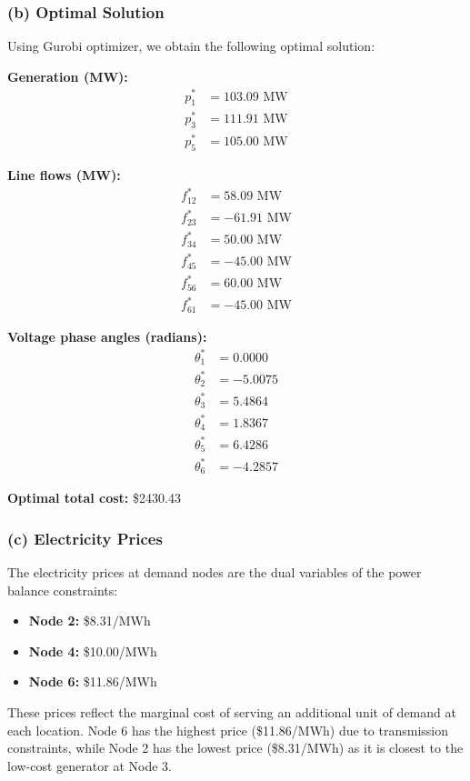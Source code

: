 \documentclass[11pt]{article}
\begin{document}
\begin{enumerate}
\subsubsection*{(b) Optimal Solution}

Using Gurobi optimizer, we obtain the following optimal solution:

\textbf{Generation (MW):}
\begin{align}
p_1^* &= 103.09 \text{ MW} \\
p_3^* &= 111.91 \text{ MW} \\
p_5^* &= 105.00 \text{ MW}
\end{align}

\textbf{Line flows (MW):}
\begin{align}
f_{12}^* &= 58.09 \text{ MW} \\
f_{23}^* &= -61.91 \text{ MW} \\
f_{34}^* &= 50.00 \text{ MW} \\
f_{45}^* &= -45.00 \text{ MW} \\
f_{56}^* &= 60.00 \text{ MW} \\
f_{61}^* &= -45.00 \text{ MW}
\end{align}

\textbf{Voltage phase angles (radians):}
\begin{align}
\theta_1^* &= 0.0000 \\
\theta_2^* &= -5.0075 \\
\theta_3^* &= 5.4864 \\
\theta_4^* &= 1.8367 \\
\theta_5^* &= 6.4286 \\
\theta_6^* &= -4.2857
\end{align}

\textbf{Optimal total cost:} \$2430.43

\subsubsection*{(c) Electricity Prices}

The electricity prices at demand nodes are the dual variables of the power balance constraints:

\begin{itemize}
    \item \textbf{Node 2:} \$8.31/MWh
    \item \textbf{Node 4:} \$10.00/MWh  
    \item \textbf{Node 6:} \$11.86/MWh
\end{itemize}

These prices reflect the marginal cost of serving an additional unit of demand at each location. Node 6 has the highest price (\$11.86/MWh) due to transmission constraints, while Node 2 has the lowest price (\$8.31/MWh) as it is closest to the low-cost generator at Node 3.

\end{enumerate}
\end{document}
